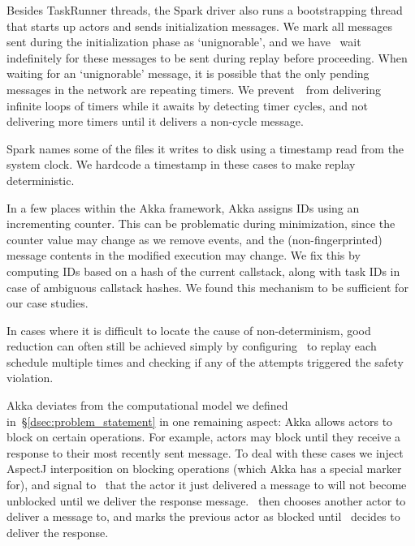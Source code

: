 
Besides
TaskRunner threads, the Spark driver also runs a bootstrapping thread
that starts up actors
and sends initialization messages. We mark all
messages sent during the initialization phase as `unignorable', and we have
\sys~wait indefinitely for these messages to be sent during
replay before proceeding. When waiting for an `unignorable'
message, it is possible that the only pending messages in the network are
repeating timers. We
prevent~\sys~from delivering infinite loops of timers while it awaits
by detecting timer cycles, and not delivering more timers until it delivers
a non-cycle message.

Spark names some of the files it writes to disk using a timestamp read from the system clock.
We hardcode a timestamp in these cases to make replay deterministic.

 In a few places within the Akka framework, Akka assigns IDs using an
incrementing counter. This can be problematic during minimization, since the counter value
may change as we remove events, and the (non-fingerprinted) message contents in the modified execution may change.
We fix this by computing IDs based on a hash
of the current callstack, along with task IDs in case of ambiguous callstack
hashes. We found this mechanism to be sufficient for our case studies.

 In cases where it is
difficult to locate the cause of non-determinism, good reduction can often
still be achieved simply by configuring \sys~to replay each schedule
multiple times and checking if any of the attempts triggered the safety
violation.

 Akka deviates from the computational model we defined
in~\S\ref{dsec:problem_statement} in one remaining aspect: Akka allows
actors to block on certain operations. For example, actors may block until they receive
a response to their most recently sent message. To deal with these cases we inject
AspectJ interposition on blocking operations (which Akka has a special marker
for), and signal to \sys~that the
actor it just delivered a message to will not become unblocked until we
deliver the response message. \sys~then chooses another actor to deliver a
message to, and marks the previous actor as blocked until \sys~decides to
deliver the response.


